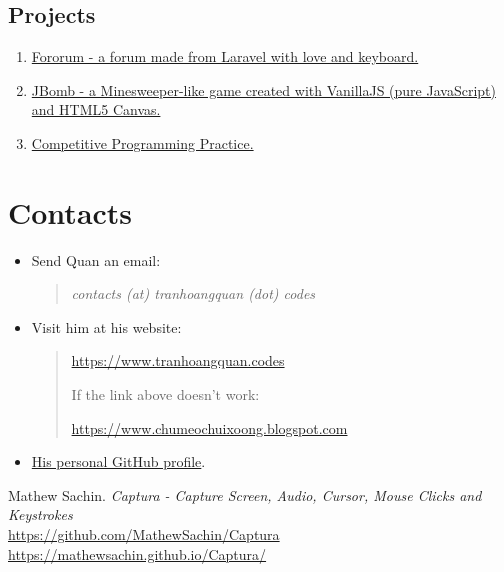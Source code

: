 \documentclass{article}
\begin{document}
       \subsection{Projects}
           \begin{enumerate}
               \item \href{https://github.com/trhgquan/Fororum}{Fororum - a forum made from Laravel with love and keyboard.}
               \item \href{https://github.com/trhgquan/JBomb}{JBomb - a Minesweeper-like game created with VanillaJS (pure JavaScript) and HTML5 Canvas.}
               \item \href{https://github.com/trhgquan/CPP}{Competitive Programming Practice.}
           \end{enumerate}

    \section{Contacts}
        \begin{itemize}
            \item Send Quan an email:
            \begin{quote}
                \itshape{contacts (at) tranhoangquan (dot) codes}
            \end{quote}
            \item Visit him at his website:
            \begin{quote}
                \href{https://www.tranhoangquan.codes}{https://www.tranhoangquan.codes}

                If the link above doesn't work:

                \href{https://www.chumeochuixoong.blogspot.com}{https://www.chumeochuixoong.blogspot.com}
            \end{quote}
            \item \href{https://github.com/trhgquan}{His personal GitHub profile}.
        \end{itemize}


    \begin{thebibliography}{5}
        Mathew Sachin.
        \textit{Captura - Capture Screen, Audio, Cursor, Mouse Clicks and Keystrokes}\\
        \href{https://github.com/MathewSachin/Captura}{https://github.com/MathewSachin/Captura}\\
        \href{https://mathewsachin.github.io/Captura/}{https://mathewsachin.github.io/Captura/}
    \end{thebibliography}
\end{document}

